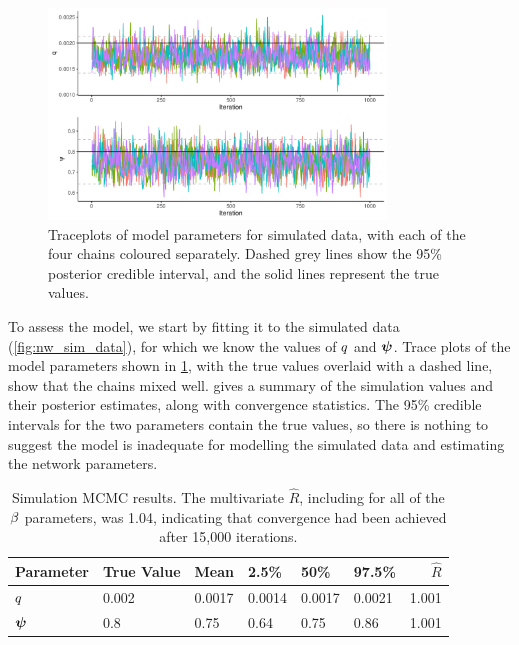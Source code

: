 \begin{knitrout}\small
{}\color{fgcolor}\begin{figure}

{\centering \includegraphics[width=0.8\textwidth]{figure/nw_model_sim_results-1} 

}

\caption[Traceplots of model parameters for simulated data, with each of the four chains coloured separately]{Traceplots of model parameters for simulated data, with each of the four chains coloured separately. Dashed grey lines show the 95\% posterior credible interval, and the solid lines represent the true values.}\label{fig:nw_model_sim_results}
\end{figure}


\end{knitrout}


To assess the model, we start by fitting it to the simulated data (\cref{fig:nw_sim_data}), for which we know the values of $q$ and $\mathbf{\boldsymbol{\psi}}$. Trace plots of the model parameters shown in \cref{fig:nw_model_sim_results}, with the true values overlaid with a dashed line, show that the chains mixed well.  gives a summary of the simulation values and their posterior estimates, along with convergence statistics. The 95\% credible intervals for the two parameters contain the true values, so there is nothing to suggest the model is inadequate for modelling the simulated data and estimating the network parameters.


\begin{table}

\caption{\label{tab:nw_model_sim_smry}Simulation MCMC results. The multivariate $\hat R$, including for all of the $\beta$ parameters, was 1.04, indicating that convergence had been achieved after 15,000 iterations.}
\centering
\begin{tabular}[b]{llllllr}
\toprule
Parameter & True Value & Mean & 2.5\% & 50\% & 97.5\% & $\hat R$\\
\midrule
$q$ & 0.002 & 0.0017 & 0.0014 & 0.0017 & 0.0021 & 1.001\\
$\mathbf{\boldsymbol{\psi}}$ & 0.8 & 0.75 & 0.64 & 0.75 & 0.86 & 1.001\\
\bottomrule
\end{tabular}
\end{table}





